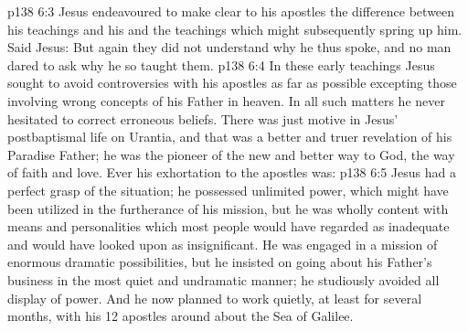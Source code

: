 \vs p138 6:3 \pc Jesus endeavoured to make clear to his apostles the difference between his teachings and his  and the teachings which might subsequently spring up  him. Said Jesus:  But again they did not understand why he thus spoke, and no man dared to ask why he so taught them.
\vs p138 6:4 In these early teachings Jesus sought to avoid controversies with his apostles as far as possible excepting those involving wrong concepts of his Father in heaven. In all such matters he never hesitated to correct erroneous beliefs. There was just  motive in Jesus’ postbaptismal life on Urantia, and that was a better and truer revelation of his Paradise Father; he was the pioneer of the new and better way to God, the way of faith and love. Ever his exhortation to the apostles was: 
\vs p138 6:5 Jesus had a perfect grasp of the situation; he possessed unlimited power, which might have been utilized in the furtherance of his mission, but he was wholly content with means and personalities which most people would have regarded as inadequate and would have looked upon as insignificant. He was engaged in a mission of enormous dramatic possibilities, but he insisted on going about his Father’s business in the most quiet and undramatic manner; he studiously avoided all display of power. And he now planned to work quietly, at least for several months, with his 12 apostles around about the Sea of Galilee.
